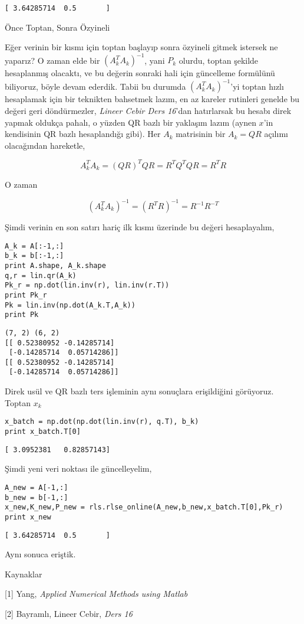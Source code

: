 \documentclass[12pt,fleqn]{article}\usepackage{../../common}
\begin{document}
\begin{verbatim}
[ 3.64285714  0.5       ]
\end{verbatim}

Önce Toptan, Sonra Özyineli

Eğer verinin bir kısmı için toptan başlayıp sonra özyineli gitmek istersek
ne yaparız? O zaman elde bir $(A_k^TA_k)^{-1}$, yani $P_{k}$ olurdu, toptan
şekilde hesaplanmış olacaktı, ve bu değerin sonraki hali için güncelleme
formülünü biliyoruz, böyle devam ederdik. Tabii bu durumda
$(A_k^TA_k)^{-1}$'yi toptan hızlı hesaplamak için bir teknikten bahsetmek
lazım, en az kareler rutinleri genelde bu değeri geri döndürmezler, {\em
  Lineer Cebir Ders 16}'dan hatırlarsak bu hesabı direk yapmak oldukça
pahalı, o yüzden QR bazlı bir yaklaşım lazım (aynen $x$'in kendisinin QR
bazlı hesaplandığı gibi). Her $A_k$ matrisinin bir $A_k = QR$ açılımı
olacağından hareketle, 

$$ A_k^TA_k = (QR)^TQR = R^TQ^TQR = R^TR $$

O zaman 

$$ (A_k^TA_k)^{-1} = (R^TR)^{-1} = R^{-1}R^{-T} $$

Şimdi verinin en son satırı hariç ilk kısmı üzerinde bu değeri hesaplayalım,

\begin{verbatim}
A_k = A[:-1,:]
b_k = b[:-1,:]
print A.shape, A_k.shape
q,r = lin.qr(A_k)
Pk_r = np.dot(lin.inv(r), lin.inv(r.T))
print Pk_r
Pk = lin.inv(np.dot(A_k.T,A_k))
print Pk
\end{verbatim}

\begin{verbatim}
(7, 2) (6, 2)
[[ 0.52380952 -0.14285714]
 [-0.14285714  0.05714286]]
[[ 0.52380952 -0.14285714]
 [-0.14285714  0.05714286]]
\end{verbatim}

Direk usül ve QR bazlı ters işleminin aynı sonuçlara erişildiğini
görüyoruz. Toptan $x_k$

\begin{verbatim}
x_batch = np.dot(np.dot(lin.inv(r), q.T), b_k)
print x_batch.T[0]
\end{verbatim}

\begin{verbatim}
[ 3.0952381   0.82857143]
\end{verbatim}

Şimdi yeni veri noktası ile güncelleyelim,

\begin{verbatim}
A_new = A[-1,:]
b_new = b[-1,:]
x_new,K_new,P_new = rls.rlse_online(A_new,b_new,x_batch.T[0],Pk_r)
print x_new
\end{verbatim}

\begin{verbatim}
[ 3.64285714  0.5       ]
\end{verbatim}

Aynı sonuca eriştik. 
 
Kaynaklar

[1] Yang, {\em Applied Numerical Methods using Matlab}

[2] Bayramlı, Lineer Cebir, {\em Ders 16}
\end{document}

